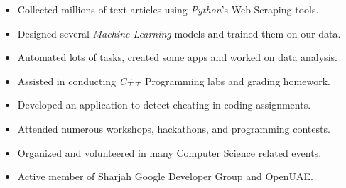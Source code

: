 \documentclass[10pt,a4paper]{lib/altacv}
\begin{document}
\divider

\begin{itemize}
  \item Collected millions of text articles using \emph{Python}'s Web Scraping tools.
  \item Designed several \emph{Machine Learning} models and trained them on our data.
  \item Automated lots of tasks, created some apps and worked on data analysis.
\end{itemize}

\divider

\begin{itemize}
  \item Assisted in conducting \emph{C++} Programming labs and grading homework.
  \item Developed an application to detect cheating in coding assignments.
\end{itemize}
\smallskip


\myprojects
\smallskip

\begin{itemize}
  \item Attended numerous workshops, hackathons, and programming contests.
  \item Organized and volunteered in many Computer Science related events.
  \item Active member of Sharjah Google Developer Group and OpenUAE.
\end{itemize}
\end{document}
